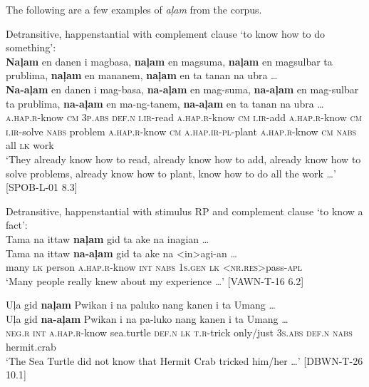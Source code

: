 The following are a few examples of \textit{aļam} from the corpus.

\ea
Detransitive, happenstantial with complement clause ‘to know how to do something’: \\
\textbf{Naļam}  en  danen  i  magbasa,  \textbf{naļam}  en  magsuma, \textbf{naļam}  en  magsulbar  ta  prublima,  \textbf{naļam}  en mananem,  \textbf{naļam}  en  ta  tanan  na  ubra … \\\smallskip
\gll \textbf{Na-aļam}  en  danen  i  mag-basa,  \textbf{na-aļam}  en  mag-suma, \textbf{na-aļam}  en  mag-sulbar  ta  prublima,  \textbf{na-aļam}  en ma-ng-tanem,  \textbf{na-aļam}  en  ta  tanan  na  ubra … \\
\textsc{a.hap.r}-know  \textsc{cm}  3\textsc{p.abs}  \textsc{def.n}  \textsc{i.ir}-read  \textsc{a.hap.r}-know  \textsc{cm}  \textsc{i.ir}-add \textsc{a.hap.r}-know  \textsc{cm}  \textsc{i.ir}-solve  \textsc{nabs}  problem  \textsc{a.hap.r}-know  \textsc{cm} \textsc{a.hap.ir-pl}-plant  \textsc{a.hap.r}-know  \textsc{cm}  \textsc{nabs}  all  \textsc{lk}  work \\
\glt `They already know how to read, already know how to add, already know how to solve problems, already know how to plant, know how to do all the work …’ [SPOB-L-01 8.3]
\z

\ea
Detransitive, happenstantial with stimulus RP and complement clause ‘to know a fact’: \\
Tama  na  ittaw  \textbf{naļam}  gid  ta  ake  na  inagian … \\\smallskip
\gll Tama  na  ittaw  \textbf{na-aļam}  gid  ta  ake  na  <in>agi-an … \\
 many  \textsc{lk}  person  \textsc{a.hap.r}-know  \textsc{int}  \textsc{nabs}  1\textsc{s.gen}  \textsc{lk}  <\textsc{nr.res}>pass-\textsc{apl} \\
\glt ‘Many people really knew about my experience …’ [VAWN-T-16 6.2]
\z

\ea
Uļa  gid  \textbf{naļam}  Pwikan  i  na  paluko  nang kanen i  ta  Umang …\\\smallskip
\gll Uļa  gid  \textbf{na-aļam}  Pwikan  i  na  pa-luko  nang kanen i  ta  Umang …\\
\textsc{neg.r}  \textsc{int}  \textsc{a.hap.r}-know  sea.turtle  \textsc{def.n}  \textsc{lk}  \textsc{t.r}-trick  only/just 3\textsc{s.abs}
\textsc{def.n}  \textsc{nabs}  hermit.crab \\
\glt `The Sea Turtle did not know that Hermit Crab tricked him/her …' [DBWN-T-26 10.1]
\z

